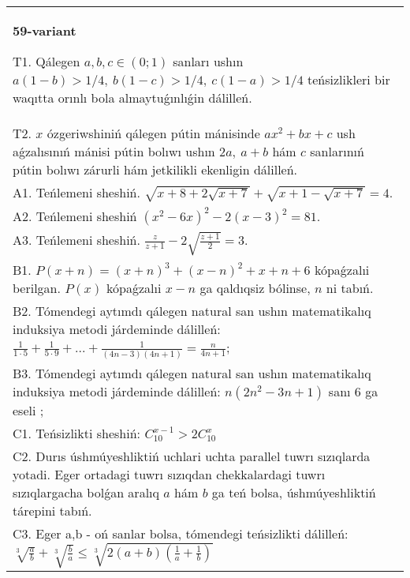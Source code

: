 \documentclass{article}
\begin{document}
\begin{tabular}{m{17cm}}
\textbf{59-variant}
\newline

T1. Qálegen \(a,b,c \in (0;1)\) sanları ushın \(a(1 - b) > 1/4,\ b(1 - c) > 1/4,\ c(1 - a) > 1/4\) teńsizlikleri bir waqıtta orınlı bola almaytuǵınlıǵin dálilleń. \\
T2. \(x\) ózgeriwshiniń qálegen pútin mánisinde \(ax^{2} + bx + c\) ush aǵzalısınıń mánisi pútin bolıwı ushın \(2a,\ a + b\) hám \(c\) sanlarınıń pútin bolıwı zárurli hám jetkilikli ekenligin dálilleń. \\
A1. Teńlemeni sheshiń. \(\sqrt{x + 8 + 2\sqrt{x + 7}} + \sqrt{x + 1 - \sqrt{x + 7}} = 4\). \\
A2. Teńlemeni sheshiń \(\left( x^{2} - 6x \right)^{2} - 2(x - 3)^{2} = 81\). \\
A3. Teńlemeni sheshiń. \(\frac{z}{z + 1} - 2\sqrt{\frac{z + 1}{2}} = 3\). \\
B1. \(P(x + n) = (x + n)^{3} + (x - n)^{2} + x + n + 6\) kópaǵzalıi berilgan. \(P(x)\) kópaǵzalıi \(x - n\) ga qaldıqsiz bólinse, \(n\) ni tabıń. \\
B2. Tómendegi aytımdı qálegen natural san ushın matematikalıq induksiya metodi járdeminde dálilleń: \(\frac{1}{1 \cdot 5} + \frac{1}{5 \cdot 9} + ... + \frac{1}{(4n - 3)(4n + 1)} = \frac{n}{4n + 1}\); \\
B3. Tómendegi aytımdı qálegen natural san ushın matematikalıq induksiya metodi járdeminde dálilleń: \(n\left( 2n^{2} - 3n + 1 \right)\) sanı 6 ga eseli ; \\
C1. Teńsizlikti sheshiń: \(C_{10}^{x - 1} > 2C_{10}^{x}\) \\
C2. Durıs úshmúyeshliktiń uchlari uchta parallel tuwrı sızıqlarda yotadi. Eger ortadagi tuwrı sızıqdan chekkalardagi tuwrı sızıqlargacha bolǵan aralıq \(a\) hám \(b\) ga teń bolsa, úshmúyeshliktiń tárepini tabıń. \\
C3. Eger a,b - oń sanlar bolsa, tómendegi teńsizlikti dálilleń: \(\sqrt[3]{\frac{a}{b}} + \sqrt[3]{\frac{b}{a}} \leq \sqrt[3]{2(a + b)\left( \frac{1}{a} + \frac{1}{b} \right)}\) \\

\end{tabular}
\vspace{1cm}
\end{document}
